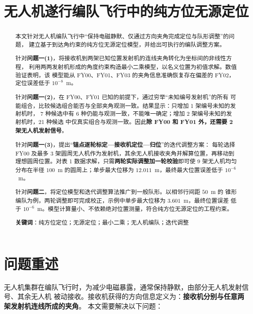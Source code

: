 \documentclass[UTF8,a4paper,11pt]{ctexart}
\title{\textbf{无人机遂行编队飞行中的纯方位无源定位}}
\date{}
\begin{document}
\maketitle

\begin{abstract}
本文针对无人机编队飞行中“保持电磁静默、仅通过方向夹角完成定位与队形调整”的问题，
建立基于到达角约束的纯方位无源定位模型，并给出可执行的编队调整方案。

针对\textbf{问题一(1)}，将接收机到两架已知位置发射机的连线夹角转化为坐标间的非线性方程，
利用两两发射机形成的角度约束构造最小二乘模型，以名义位置为初值求解。数值验证表明，该
模型能从 FY00、FY01、FY03 的夹角信息准确恢复存在偏差的 FY02，定位误差低于
$10^{-8}$~m。

针对\textbf{问题一(2)}，在 FY00、FY01 已知的前提下，通过穷举“未知编号发射机”的所有
可能组合，比较候选组合能否与全部夹角观测一致。结果显示：只增加 1 架编号未知的发射机时，
7 种候选中有 6 种仍能与观测一致，不能唯一确定；增加 2 架编号未知的发射机时，21 种候选
中仅真实组合与观测一致。因此\textbf{除 FY00 和 FY01 外，还需要 2 架无人机发射信号}。

针对\textbf{问题一(3)}，提出“\textbf{锚点逐轮标定—接收机定位—归位}”的迭代调整方案：
每轮选择 FY00 及最多 3 架圆周无人机作为发射机，其余无人机接收夹角并解算位置，再移动到
理想圆周位置。对表 1 数据求解，只需\textbf{两轮实际调整加一轮校验}即可使 9 架无人机均匀
分布在半径 $100$~m 的圆周上；单步最大位移为 $12.011$~m，最终最大位置误差低于
$10^{-6}$~m。

针对\textbf{问题二}，将定位模型和迭代调整算法推广到一般队形。以相邻行间距 $50$~m 的
锥形编队为例，两轮调整即可完成校正，示例中单步最大位移为 $3.601$~m，最终位置误差
低于 $10^{-6}$~m。模型计算量小、不依赖绝对位置测量，符合纯方位无源定位的工程约束。

\textbf{关键词}：纯方位定位；无源定位；最小二乘；无人机编队；迭代调整
\end{abstract}

\section{问题重述}

无人机集群在编队飞行时，为减少电磁暴露，通常保持静默，由部分无人机发射信号、其余无人机
被动接收。接收机获得的方向信息定义为：\textbf{接收机分别与任意两架发射机连线所成的夹角}。
本文需要解决以下问题：
\end{document}

